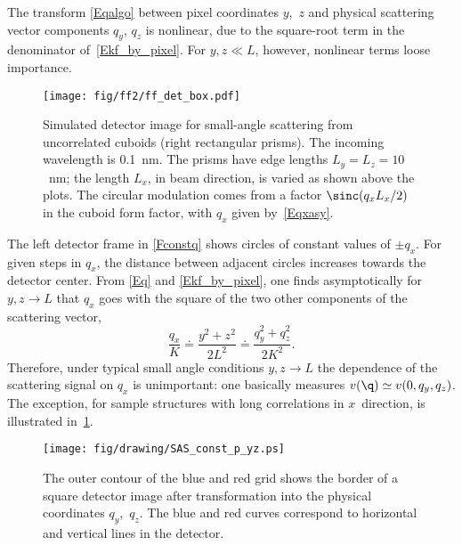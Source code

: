 The transform \cref{Eqalgo} between pixel coordinates $y$,~$z$
and physical scattering vector components $q_y$, $q_z$
is nonlinear, due to the square-root term in the denominator of~\cref{Ekf_by_pixel}.
For $y,z\ll L$, however, nonlinear terms loose importance.

\begin{figure}[t]
\begin{center}
\texttt{[image: fig/ff2/ff\_det\_box.pdf]}
\end{center}
\caption{Simulated detector image for small-angle scattering from
uncorrelated cuboids (right rectangular prisms).
The incoming wavelength is 0.1~nm.
The prisms have edge lengths $L_y=L_z=10$~nm;
the length $L_x$, in beam direction, is varied as shown above the plots.
%
The circular modulation comes from a factor $\sinc(q_x L_x/2)$
in the cuboid form factor, with $q_x$ given by~\cref{Eqxasy}.}
\label{Fdetbox}
\end{figure}

The left detector frame in \cref{Fconstq}
shows circles of constant values of $\pm q_x$.
For given steps in $q_x$, the distance between adjacent circles
increases towards the detector center.
From \cref{Eq} and \cref{Ekf_by_pixel},
one finds asymptotically for $y,z\to L$
that $q_x$ goes with the square of the two other components of the scattering vector,
\begin{equation}\label{Eqxasy}
  \frac{q_x}{K}
  \doteq \frac{y^2+z^2}{2 L^2}
  \doteq \frac{q_y^2 + q_z^2}{2K^2}.
\end{equation}
Therefore, under typical small angle conditions $y,z\to L$
the dependence of the scattering signal on $q_x$ is unimportant:
one basically measures $v(\q)\simeq v(0,q_y,q_z)$.
The exception, for sample structures with long correlations in $x$~direction,
is illustrated in~\cref{Fdetbox}.

\begin{figure}[t]
\begin{center}
\texttt{[image: fig/drawing/SAS\_const\_p\_yz.ps]}
\end{center}
\caption{The outer contour of the blue and red grid
shows the border of a square detector image
after transformation into the physical coordinates $q_y$,~$q_z$.
The blue and red curves correspond to horizontal and vertical lines in the detector.}
\label{Fconstp}
\end{figure}

